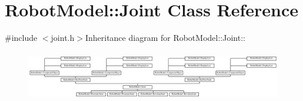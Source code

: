\hypertarget{class_robot_model_1_1_joint}{
\section{RobotModel::Joint Class Reference}
\label{class_robot_model_1_1_joint}
}


{\ttfamily \#include $<$joint.h$>$}Inheritance diagram for RobotModel::Joint::\begin{figure}[H]
\begin{center}
\leavevmode
\includegraphics[height=2.23404cm]{class_robot_model_1_1_joint}
\end{center}
\end{figure}
